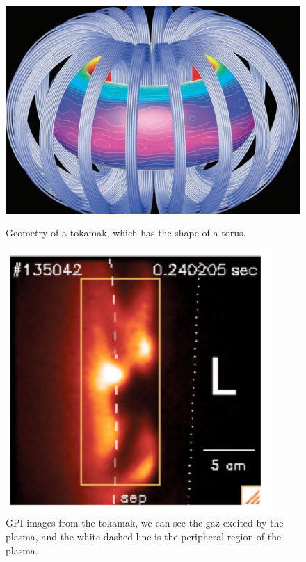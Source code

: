 \documentclass[10pt,conference]{IEEEtran}
\begin{document}
\begin{figure}[!b]
  \centering
  \begin{minipage}[b]{0.2\textwidth}
    \includegraphics[width=\textwidth]{images/tokamak.png}
    \caption{Geometry of a tokamak\cite{tokamak}, which has the shape of a torus.}
    \label{figure:geometrytokamak}
  \end{minipage}
  \hfill
  \begin{minipage}[b]{0.18\textwidth}
    \includegraphics[width=\textwidth]{images/blob.PNG}
    \caption{GPI images from the tokamak, we can see the gaz excited by the plasma, and the white dashed line is the peripheral region of the plasma.\cite{zweben}}
    \label{figure:gpiimage}
  \end{minipage}
\end{figure}
\end{document}
